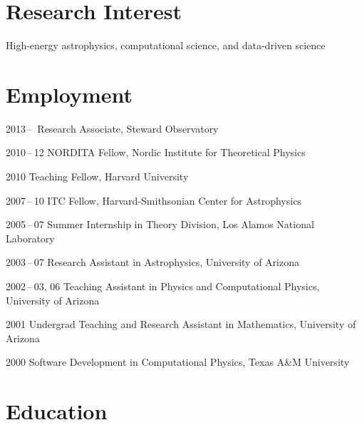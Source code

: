 \section*{Research Interest}

High-energy astrophysics, computational science, and data-driven science

\section*{Employment}

\begin{tlist}

\item[2013\,--\,] Research Associate, Steward Observatory

\item[2010\,--\,12] NORDITA Fellow, Nordic Institute for Theoretical
  Physics

\item[2010] Teaching Fellow, Harvard University

\item[2007\,--\,10] ITC Fellow, Harvard-Smithsonian Center for
  Astrophysics

\item[2005\,--\,07] Summer Internship in Theory Division, Los Alamos
  National Laboratory

\item[2003\,--\,07] Research Assistant in Astrophysics, University of Arizona

\item[2002\,--\,03, 06] Teaching Assistant in Physics and
  Computational Physics, University of Arizona

\item[2001] Undergrad Teaching and Research Assistant in Mathematics,
  University of Arizona

\item[2000] Software Development in Computational Physics, Texas A\&M
  University

\end{tlist}


\section*{Education}

